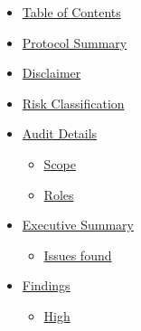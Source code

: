 \begin{itemize}
\tightlist
\item
  \hyperref[table-of-contents]{Table of Contents}
\item
  \hyperref[protocol-summary]{Protocol Summary}
\item
  \hyperref[disclaimer]{Disclaimer}
\item
  \hyperref[risk-classification]{Risk Classification}
\item
  \hyperref[audit-details]{Audit Details}

  \begin{itemize}
  \tightlist
  \item
    \hyperref[scope]{Scope}
  \item
    \hyperref[roles]{Roles}
  \end{itemize}
\item
  \hyperref[executive-summary]{Executive Summary}

  \begin{itemize}
  \tightlist
  \item
    \hyperref[issues-found]{Issues found}
  \end{itemize}
\item
  \hyperref[findings]{Findings}

  \begin{itemize}
  \tightlist
  \item
    \hyperref[high]{High}


\end{itemize}
\end{itemize}
